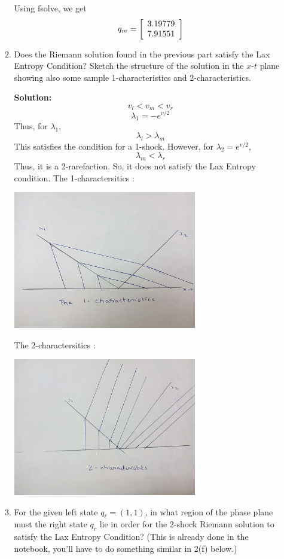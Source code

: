 \documentclass[11pt]{article}
\newenvironment{mat}{\left[ \begin{array}{ccccccccccccc}}{\end{array}\right]}
\newcommand\bcm{\begin{mat}}
\newcommand\ecm{\end{mat}}
\begin{document}
\begin{enumerate}
\begin{enumerate}
Using fsolve, we get 
\[q_m = \bcm 3.19779 \\  7.91551 \ecm \]
\item Does the Riemann solution found in the previous part
satisfy the Lax Entropy
Condition?  Sketch the structure of the solution in the $x$-$t$ plane
showing also some sample 1-characteristics and 2-characteristics.

\vskip 1cm
{\bf Solution:}
\[v_l<v_m<v_r\]
\[ \lambda_1 = -e^{v/2} \]
Thus, for $\lambda_1$,
 \[ \lambda_l>\lambda_m\]
 This satisfies the condition for a 1-shock.
 However,
 for $\lambda_2  = e^{v/2}$,
 \[ \lambda_m<\lambda_r\]
 Thus, it is a 2-rarefaction. So, it does not satisfy the Lax Entropy condition. 
 \vskip 1cm
 The 1-charactersitics :
 
 \begin{minipage}{\linewidth}
 	\centering
 	\includegraphics[width=8cm]{im1}
 \end{minipage}
 
 \vskip 1cm
  The 2-charactersitics :
  
  \begin{minipage}{\linewidth}
  	\centering
  	\includegraphics[width=8cm]{im2}
  \end{minipage}

\vskip 1cm
\item For the given left state $q_\ell = (1,1)$, in what region of the phase 
plane must the
right state $q_r$ lie in order for the 2-shock Riemann solution to satisfy
the Lax Entropy Condition?  
(This is already done in the notebook, you'll have to do something similar
in 2(f) below.) 


\end{enumerate}
\end{enumerate}
\end{document}
